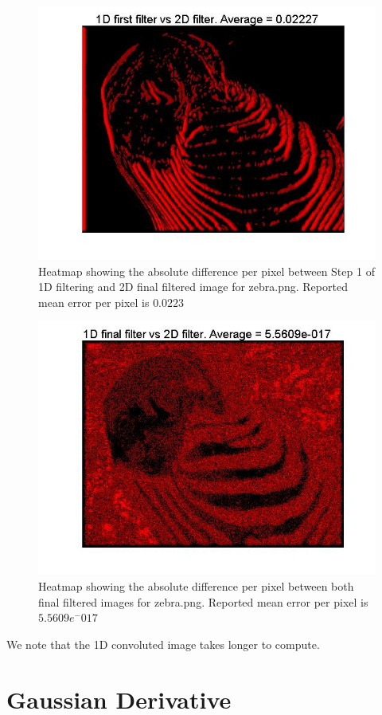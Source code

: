 \documentclass[11pt]{article}
\begin{document}
\begin{figure}[H]
	\centering
	\includegraphics[width=.9\textwidth]{imgs/zebra_col_heatmap.jpg}
	\caption{Heatmap showing the absolute difference per pixel between Step 1 of 1D filtering and 2D final filtered image for zebra.png. Reported mean error per pixel is $0.0223$}
	\label{fig:zebra_col_heatmap}
\end{figure}

\begin{figure}[H]
	\centering
	\includegraphics[width=.9\textwidth]{imgs/zebra_heatmap.jpg}
	\caption{Heatmap showing the absolute difference per pixel between both final filtered images for zebra.png. Reported mean error per pixel is $5.5609 e^-017$}
	\label{fig:zebra_heatmap}
\end{figure}

We note that the 1D convoluted image takes longer to compute. 

\section{Gaussian Derivative}
\end{document}
